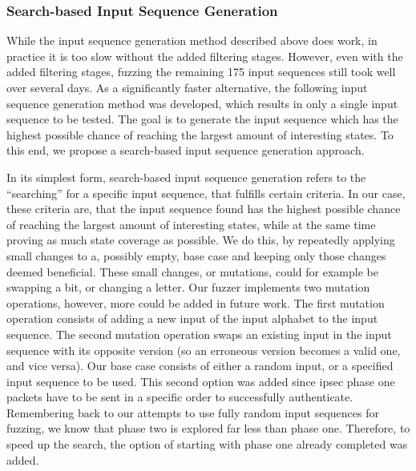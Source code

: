 \subsubsection{Search-based Input Sequence Generation} \label{subsubsec:search}
While the input sequence generation method described above does work, in practice it is too slow without the added filtering stages. However, even with the added filtering stages, fuzzing the remaining 175 input sequences still took well over several days. As a significantly faster alternative, the following input sequence generation method was developed, which results in only a single input sequence to be tested. The goal is to generate the input sequence which has the highest possible chance of reaching the largest amount of interesting states. To this end, we propose a  search-based input sequence generation approach. 

In its simplest form, search-based input sequence generation refers to the ``searching'' for a specific input sequence, that fulfills certain criteria. In our case, these criteria are, that the input sequence found has the highest possible chance of reaching the largest amount of interesting states, while at the same time proving as much state coverage as possible. We do this, by repeatedly applying small changes to a, possibly empty, base case and keeping only those changes deemed beneficial. These small changes, or mutations, could for example be swapping a bit, or changing a letter. Our fuzzer implements two mutation operations, however, more could be added in future work. The first mutation operation consists of adding a new input of the input alphabet to the input sequence. The second mutation operation swaps an existing input in the input sequence with its opposite version (so an erroneous version becomes a valid one, and vice versa). Our base case consists of either a random input, or a specified input sequence to be used. This second option was added since \ac{ipsec} phase one packets have to be sent in a specific order to successfully authenticate. Remembering back to our attempts to use fully random input sequences for fuzzing, we know that phase two is explored far less than phase one. Therefore, to speed up the search, the option of starting with phase one already completed was added.

